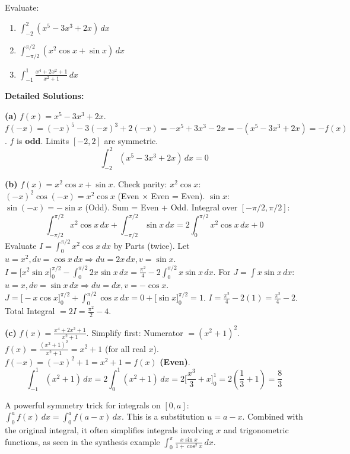 \documentclass[11pt]{article}
\begin{document}
\begin{exoresolu}
Evaluate:
\begin{enumerate}
    \item $\displaystyle \int_{-2}^2 (x^5 - 3x^3 + 2x)\,dx$
    \item $\displaystyle \int_{-\pi/2}^{\pi/2} (x^2 \cos x + \sin x)\,dx$
    \item $\displaystyle \int_{-1}^1 \frac{x^4 + 2x^2 + 1}{x^2+1}\,dx$
\end{enumerate}
\tcblower
\textbf{Detailed Solutions:}

\textbf{(a)} $f(x) = x^5 - 3x^3 + 2x$.
$f(-x) = (-x)^5 - 3(-x)^3 + 2(-x) = -x^5 + 3x^3 - 2x = -(x^5 - 3x^3 + 2x) = -f(x)$.
$f$ is \textbf{odd}. Limits $[-2, 2]$ are symmetric.
\[
\boxed{\int_{-2}^2 (x^5 - 3x^3 + 2x)\,dx = 0}
\]

\textbf{(b)} $f(x) = x^2 \cos x + \sin x$.
Check parity:
$x^2\cos x$: $(-x)^2\cos(-x) = x^2\cos x$ (Even $\times$ Even = Even).
$\sin x$: $\sin(-x) = -\sin x$ (Odd).
Sum = Even + Odd.
Integral over $[-\pi/2, \pi/2]$:
\[
\int_{-\pi/2}^{\pi/2} x^2\cos x\,dx + \int_{-\pi/2}^{\pi/2} \sin x\,dx = 2\int_0^{\pi/2} x^2\cos x\,dx + 0
\]
Evaluate $I = \int_0^{\pi/2} x^2\cos x\,dx$ by Parts (twice).
Let $u=x^2, dv=\cos x\,dx \Rightarrow du=2x\,dx, v=\sin x$.
$I = \Big[x^2\sin x\Big]_0^{\pi/2} - \int_0^{\pi/2} 2x\sin x\,dx = \frac{\pi^2}{4} - 2\int_0^{\pi/2} x\sin x\,dx$.
For $J = \int x\sin x\,dx$: $u=x, dv=\sin x\,dx \Rightarrow du=dx, v=-\cos x$.
$J = \Big[-x\cos x\Big]_0^{\pi/2} + \int_0^{\pi/2} \cos x\,dx = 0 + \Big[\sin x\Big]_0^{\pi/2} = 1$.
$I = \frac{\pi^2}{4} - 2(1) = \frac{\pi^2}{4} - 2$.
Total Integral $= 2I = \boxed{\frac{\pi^2}{2} - 4}$.

\textbf{(c)} $f(x) = \frac{x^4 + 2x^2 + 1}{x^2+1}$.
Simplify first: Numerator $= (x^2+1)^2$.
$f(x) = \frac{(x^2+1)^2}{x^2+1} = x^2+1$ (for all real $x$).
$f(-x) = (-x)^2+1 = x^2+1 = f(x)$ \textbf{(Even)}.
\[
\int_{-1}^1 (x^2+1)\,dx = 2\int_0^1 (x^2+1)\,dx = 2\Big[ \frac{x^3}{3} + x \Big]_0^1 = 2\left(\frac{1}{3}+1\right) = \boxed{\frac{8}{3}}
\]
\end{exoresolu}

\begin{savaistu}
A powerful symmetry trick for integrals on $[0,a]$: $\int_0^a f(x)\,dx = \int_0^a f(a-x)\,dx$. This is a substitution $u=a-x$. Combined with the original integral, it often simplifies integrals involving $x$ and trigonometric functions, as seen in the synthesis example $\int_0^\pi \frac{x\sin x}{1+\cos^2 x}\,dx$.
\end{savaistu}
\end{document}
